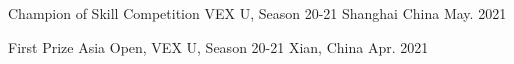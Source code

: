 \begin{cvhonors}

\cvhonor
{Champion of Skill Competition} %
{VEX U, Season 20-21} %
{Shanghai China} %
{May. 2021} %

  \cvhonor
    {First Prize} %
    { Asia Open, VEX U, Season 20-21} %
    {Xian, China} %
    {Apr. 2021} %







\end{cvhonors}



